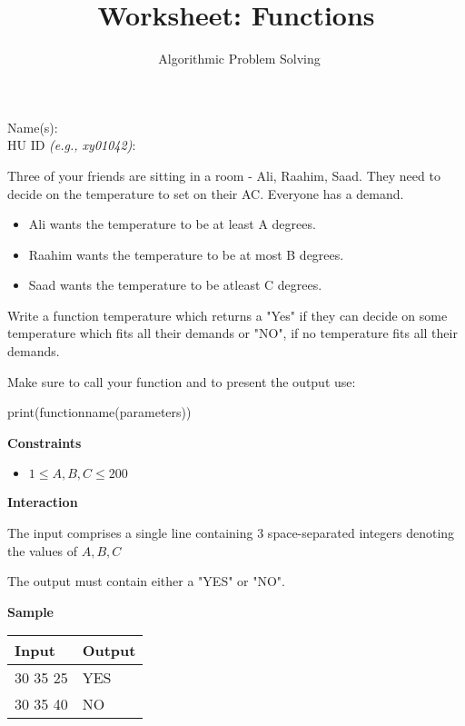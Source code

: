\documentclass[a4paper]{exam}
\title{Worksheet: Functions}
\author{\class\ Algorithmic Problem Solving}
\date{\term}
\newcommand\heading[1]{\textbf{#1}}
\begin{document}
\maketitle

Name(s): \hrulefill\\[5pt]
HU ID \textit{\small(e.g., xy01042)}: \hrulefill\\

\begin{questions}


    Three of your friends are sitting in a room - Ali, Raahim, Saad. They need to decide on the temperature to set on their AC. Everyone has a demand.
    \begin{itemize}
        \item Ali wants the temperature to be at least A degrees.
        \item Raahim wants the temperature to be at most B degrees.
        \item Saad wants the temperature to be atleast C degrees.
    \end{itemize}

    Write a function temperature which returns a "Yes" if they can decide on some temperature which fits all their demands or "NO", if no temperature fits all their demands.

    Make sure to call your function and to present the output use:

    print(functionname(parameters))

    \heading{Constraints}
    \begin{itemize}
        \item $ 1 \leq A,B,C \leq 200 $

    \end{itemize}

    \heading{Interaction}

    The input comprises a single line containing 3 space-separated integers denoting the values of $A, B, C$

    The output must contain either a "YES" or "NO".

    \heading{Sample}

    \begin{tabularx}{\textwidth}{|X|X|}
        \rowcolor{gray!50}
        \hline
        Input    & Output \\ \hline\hline
        30 35 25 & YES    \\\hline
        30 35 40 & NO     \\\hline
    \end{tabularx}


\end{questions}
\end{document}
